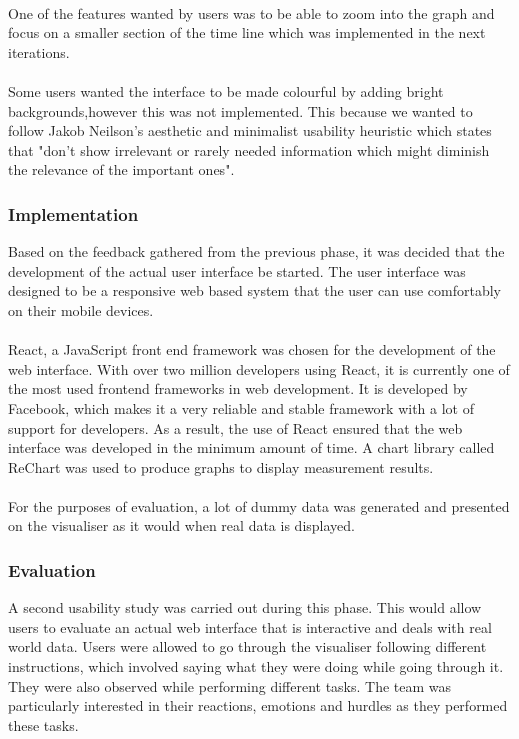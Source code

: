 \paragraph{}
One of the features wanted by users was to be able to zoom into the graph and focus on a smaller section of the time line which was implemented in the next iterations.
\paragraph{}
Some users wanted the interface to be made colourful by adding bright backgrounds,however this was not implemented. This because we wanted to follow Jakob Neilson's aesthetic and minimalist usability heuristic which states that "don't show irrelevant or rarely needed information which might diminish the relevance of the important ones"\cite{Nielsen:1992:FUP:142750.142834}.
\subsubsection{Implementation}
Based on the feedback gathered from the previous phase, it was decided that the development of the actual user interface be started. The user interface was designed to be a responsive web based system that the user can use comfortably on their mobile devices.
\paragraph{}
React, a JavaScript front end framework was chosen for the development of the web interface. With over two million developers using React, it is currently one of the most used frontend frameworks in web development\cite{githubreact}. It is developed by Facebook, which makes it a very reliable and stable framework with a lot of support for developers\cite{githubreact}. As a result, the use of React ensured that the web interface was developed in the minimum amount of time. A chart library called ReChart was used to produce graphs to display measurement results.
\paragraph{}
For the purposes of evaluation, a lot of dummy data was generated and presented on the visualiser as it would when real data is displayed.

\subsubsection{Evaluation}
A second usability study was carried out during this phase. This would allow users to evaluate an actual web interface that is interactive and deals with real world data. Users were allowed to go through the visualiser following different instructions, which involved saying what they were doing while going through it. They were also observed while performing different tasks. The team was particularly interested in their reactions, emotions and hurdles as they performed these tasks.
